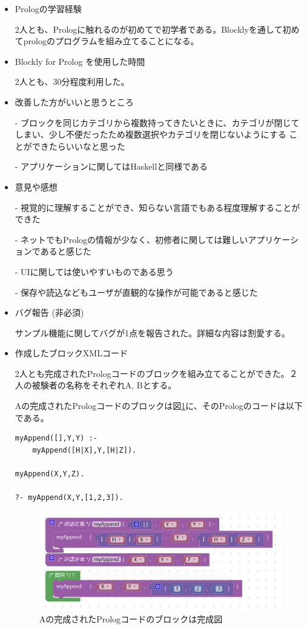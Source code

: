 \documentclass{risepaper}
\begin{document}
\begin{itemize}
\item Prologの学習経験

2人とも、Prologに触れるのが初めてで初学者である。Blocklyを通して初めてprologのプログラムを組み立てることになる。

\item Blockly for Prolog を使用した時間

2人とも、30分程度利用した。

\item 改善した方がいいと思うところ

- ブロックを同じカテゴリから複数持ってきたいときに、カテゴリが閉じてしまい、少し不便だったため複数選択やカテゴリを閉じないようにする
ことができたらいいなと思った

- アプリケーションに関してはHaskellと同様である

\item 意見や感想

- 視覚的に理解することができ、知らない言語でもある程度理解することができた

- ネットでもPrologの情報が少なく、初修者に関しては難しいアプリケーションであると感じた

- UIに関しては使いやすいものである思う

- 保存や読込などもユーザが直観的な操作が可能であると感じた

\item バグ報告 (非必須)

サンプル機能に関してバグが1点を報告された。詳細な内容は割愛する。

\item 作成したブロックXMLコード

2人とも完成されたPrologコードのブロックを組み立てることができた。２人の被験者の名称をそれぞれA, Bとする。

Aの完成されたPrologコードのブロックは図\ref{fig:prolog_experiment_result_a}に、そのPrologのコードは以下である。
\begin{lstlisting}[basicstyle=\ttfamily\footnotesize]
myAppend([],Y,Y) :-
    myAppend([H|X],Y,[H|Z]).

myAppend(X,Y,Z).

?- myAppend(X,Y,[1,2,3]).
\end{lstlisting}

\begin{figure}[h]
\begin{center}
\includegraphics[scale=0.5]{img/prolog_experiment_result_a.PNG}
\caption{Aの完成されたPrologコードのブロックは完成図}%
\label{fig:prolog_experiment_result_a}
\end{center}%
\end{figure}%


\end{itemize}
\end{document}
